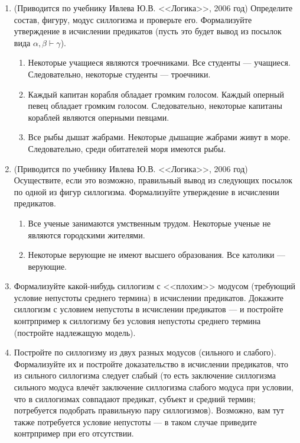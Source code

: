 \documentclass[10pt,a4paper,oneside]{article}
\begin{document}
\begin{enumerate}
\item (Приводится по учебнику Ивлева Ю.В. <<Логика>>, 2006 год) Определите состав, фигуру, модус силлогизма и проверьте его.
Формализуйте утверждение в исчислении предикатов (пусть это будет вывод из посылок вида $\alpha,\beta\vdash\gamma$).
\begin{enumerate}
\item Некоторые учащиеся являются троечниками. Все студенты --- учащиеся. Следовательно, некоторые студенты --- троечники.
\item Каждый капитан корабля обладает громким голосом. Каждый оперный певец обладает громким голосом. Следовательно, некоторые капитаны кораблей являются оперными певцами.
\item Все рыбы дышат жабрами. Некоторые дышащие жабрами живут в море. Следовательно, среди обитателей моря имеются рыбы.
\end{enumerate}
\item (Приводится по учебнику Ивлева Ю.В. <<Логика>>, 2006 год) Осуществите, если это возможно, правильный вывод из следующих посылок по одной из фигур силлогизма. 
Формализуйте утверждение в исчислении предикатов.
\begin{enumerate}
\item Все ученые занимаются умственным трудом. Некоторые ученые не являются городскими жителями.
\item Некоторые верующие не имеют высшего образования. Все католики --- верующие.
\end{enumerate}
\item Формализуйте какой-нибудь силлогизм с <<плохим>> модусом (требующий условие непустоты среднего термина) в исчислении предикатов. 
Докажите силлогизм с условием непустоты в исчислении предикатов --- и постройте контрпример к силлогизму без условия непустоты среднего термина (постройте надлежащую модель).
\item Постройте по силлогизму из двух разных модусов (сильного и слабого). Формализуйте их и постройте доказательство в исчислении предикатов, что из сильного силлогизма следует слабый 
(то есть заключение силлогизма сильного модуса влечёт заключение силлогизма слабого модуса при условии, что в силлогизмах совпадают предикат, субъект и средний термин;
потребуется подобрать правильную пару силлогизмов). 
Возможно, вам тут также потребуется условие непустоты --- в таком случае приведите контрпример при его отсутствии.


\end{enumerate}
\end{document}
